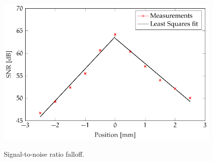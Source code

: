 \begin{figure}[hbt]
\myfloatalign
{\includegraphics[width=0.9\linewidth]{gfx/falloff-fit}}
\caption{Signal-to-noise ratio falloff.}\label{fig:falloff-fit}
\end{figure}



